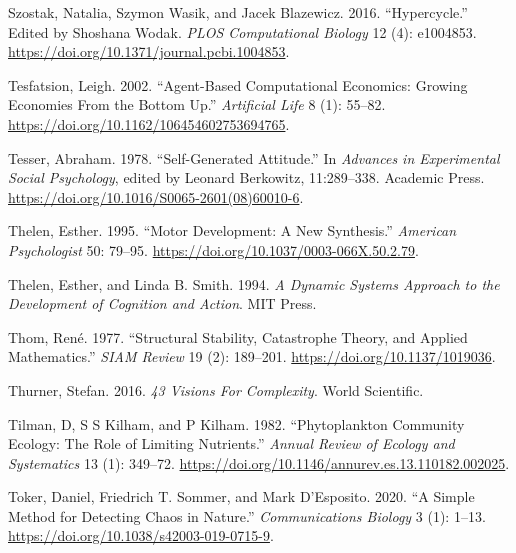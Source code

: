 \documentclass[
  a4paper,
  DIV=11,
  numbers=noendperiod,
  oneside]{scrreprt}
\newlength{\cslhangindent}
\newlength{\cslentryspacingunit} %
\newenvironment{CSLReferences}[2] %
 {%
  \setlength{\parindent}{0pt}
  \ifodd #1
  \let\oldpar\par
  \def\par{\hangindent=\cslhangindent\oldpar}
  \fi
  \setlength{\parskip}{#2\cslentryspacingunit}
 }%
 {}
\begin{document}
\begin{CSLReferences}{1}{0}
\leavevmode{}%
Szostak, Natalia, Szymon Wasik, and Jacek Blazewicz. 2016.
{``Hypercycle.''} Edited by Shoshana Wodak. \emph{PLOS Computational
Biology} 12 (4): e1004853.
\url{https://doi.org/10.1371/journal.pcbi.1004853}.

\leavevmode{}%
Tesfatsion, Leigh. 2002. {``Agent-{Based Computational Economics}:
{Growing Economies From} the {Bottom Up}.''} \emph{Artificial Life} 8
(1): 55--82. \url{https://doi.org/10.1162/106454602753694765}.

\leavevmode{}%
Tesser, Abraham. 1978. {``Self-{Generated Attitude}.''} In
\emph{Advances in {Experimental Social Psychology}}, edited by Leonard
Berkowitz, 11:289--338. {Academic Press}.
\url{https://doi.org/10.1016/S0065-2601(08)60010-6}.

\leavevmode{}%
Thelen, Esther. 1995. {``Motor Development: {A} New Synthesis.''}
\emph{American Psychologist} 50: 79--95.
\url{https://doi.org/10.1037/0003-066X.50.2.79}.

\leavevmode{}%
Thelen, Esther, and Linda B. Smith. 1994. \emph{A {Dynamic Systems
Approach} to the {Development} of {Cognition} and {Action}}. {MIT
Press}.

\leavevmode{}%
Thom, René. 1977. {``Structural {Stability}, {Catastrophe Theory}, and
{Applied Mathematics}.''} \emph{SIAM Review} 19 (2): 189--201.
\url{https://doi.org/10.1137/1019036}.

\leavevmode{}%
Thurner, Stefan. 2016. \emph{43 Visions For Complexity}. World
Scientific.

\leavevmode{}%
Tilman, D, S S Kilham, and P Kilham. 1982. {``Phytoplankton {Community
Ecology}: {The Role} of {Limiting Nutrients}.''} \emph{Annual Review of
Ecology and Systematics} 13 (1): 349--72.
\url{https://doi.org/10.1146/annurev.es.13.110182.002025}.

\leavevmode{}%
Toker, Daniel, Friedrich T. Sommer, and Mark D'Esposito. 2020. {``A
Simple Method for Detecting Chaos in Nature.''} \emph{Communications
Biology} 3 (1): 1--13. \url{https://doi.org/10.1038/s42003-019-0715-9}.


\end{CSLReferences}
\end{document}

